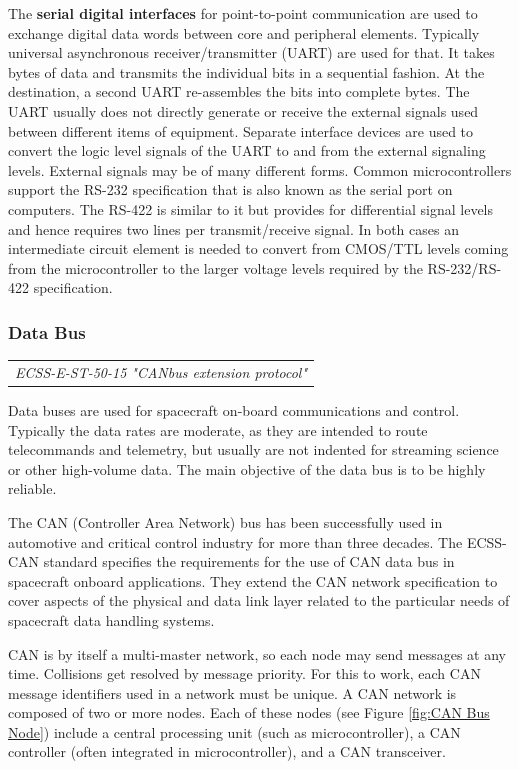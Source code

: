 The \textbf{serial digital interfaces} for point-to-point communication are used to exchange digital data words between core and peripheral elements. Typically universal asynchronous receiver/transmitter (UART) are used for that. It takes bytes of data and transmits the individual bits in a sequential fashion. At the destination, a second UART re-assembles the bits into complete bytes. The UART usually does not directly generate or receive the external signals used between different items of equipment. Separate interface devices are used to convert the logic level signals of the UART to and from the external signaling levels. External signals may be of many different forms. Common microcontrollers support the RS-232 specification that is also known as the serial port on computers. The RS-422 is similar to it but provides for differential signal levels and hence requires two lines per transmit/receive signal. In both cases an intermediate circuit element is needed to convert from CMOS/TTL levels coming from the microcontroller to the larger voltage levels required by the RS-232/RS-422 specification.
 
\subsubsection{Data Bus}

\begin{tabular}{l}
\textit{ECSS-E-ST-50-15 "CANbus extension protocol" \cite{ECSS-E-ST-50-15}} \\
\end{tabular}

Data buses are used for spacecraft on-board communications and control. Typically the data rates are moderate, as they are intended to route telecommands and telemetry, but usually are not indented for streaming science or other high-volume data. The main objective of the data bus is to be highly reliable.

The CAN (Controller Area Network) bus has been successfully used in automotive and critical control industry for more than three decades. The ECSS-CAN standard specifies the requirements for the use of CAN data bus in spacecraft onboard applications. They extend the CAN network specification to cover aspects of the physical and data link layer related to the particular needs of spacecraft data handling systems. 

CAN is by itself a multi-master network, so each node may send messages at any time. Collisions get resolved by message priority. For this to work, each CAN message identifiers used in a network must be unique. A CAN network is composed of two or more nodes. Each of these nodes (see Figure \ref{fig:CAN Bus Node}) include a central processing unit (such as microcontroller), a CAN controller (often integrated in microcontroller), and a CAN transceiver. 

